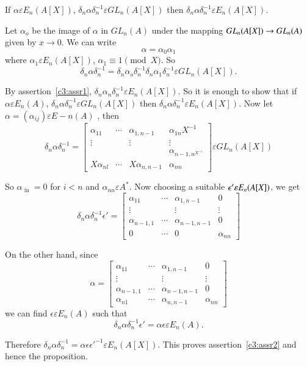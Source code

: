 \begin{assr}\label{c3:assr2}
If $\alpha \varepsilon E_n(A[X])$, $\delta_n\alpha
\delta^{-1}_n\varepsilon GL_n(A[X])$ then $\delta_n\alpha
\delta^{-1}_n\varepsilon E_n(A[X])$.

Let $\alpha_o$ be the image of $\alpha$ in $GL_n(A)$ under the mapping
$GL_n\\(A[X])\rightarrow GL_n(A)$ given by $x\rightarrow 0$. We can
write
$$
\alpha=\alpha_0\alpha_1
$$
where $\alpha_1\varepsilon E_n(A[X])$, $\alpha_1\equiv 1 \pmod X$. So 
$$
\delta_n\alpha\delta^{-1}_n=\delta_n\alpha_o\delta^{-1}_n\delta_n\alpha_1\delta^{-1}_n
\varepsilon GL_n(A[X]). 
$$

By assertion~\ref{c3:assr1}, $\delta_n\alpha_n\delta^{-1}_n\varepsilon
E_n(A[X])$. So it is enough to show that if $\alpha \varepsilon
E_n(A)$, $\delta_n\alpha \delta^{-1}_n\varepsilon GL_n(A[X])$ then
$\delta_n\alpha \delta^{-1}_n\varepsilon E_n (A[X])$. Now let $\alpha=
(\alpha_{ij})\varepsilon E-n(A)$ , then 
$$
\delta_n\alpha\delta^{-1}_n=
\begin{bmatrix}
\alpha_{11} &\cdots & \alpha_{1,n-1} & \alpha_{1n}X^{-1}\\
\vdots & & \vdots & \vdots\\
& & & \alpha_{n-1,n^{X^{-1}}}\\
X\alpha_{nl}&\cdots &X\alpha_{n,n-1} & \alpha_{nn}
\end{bmatrix} \varepsilon GL_n(A[X])
$$

So $\alpha_{\text{ in }}=0$ for $i<n$ and $\alpha_{nn}\varepsilon
A^{\ast}$. Now choosing a suitable $\epsilon'\varepsilon \\E_n(A[X])$, we
get
$$
\delta_n\alpha \delta^{-1}_n\epsilon'=
\begin{bmatrix}
\alpha_{11}& \cdots & \alpha_{1,n-1} &0\\
\vdots & & \vdots & \vdots\\
\alpha_{n-1,1} & \cdots & \alpha_{n-1,n-1}& 0\\
0 & \cdots & 0 &  \alpha_{nn}
\end{bmatrix}
$$

On the other hand, since
$$
\alpha=
\begin{bmatrix}
\alpha_{11}&\cdots & \alpha_{1,n-1} & 0\\
\vdots & & \vdots & \vdots\\
\alpha_{n-1,1} & \cdots & \alpha_{n-1,n-1} &0\\
\alpha_{n1}& \cdots & \alpha_{n,n-1} & \alpha_{nn}
\end{bmatrix}
$$
we can find $\epsilon \varepsilon E_n(A)$ such that 
$$
\delta_n\alpha\delta^{-1}_n\epsilon'=\alpha\epsilon \varepsilon E_n(A).
$$

Therefore $\delta_n\alpha\delta^{-1}_n=\alpha\epsilon
\epsilon'^{-1}\varepsilon E_n(A[X])$. 
This proves assertion~\ref{c3:assr2} and hence the proposition.
\end{assr}


